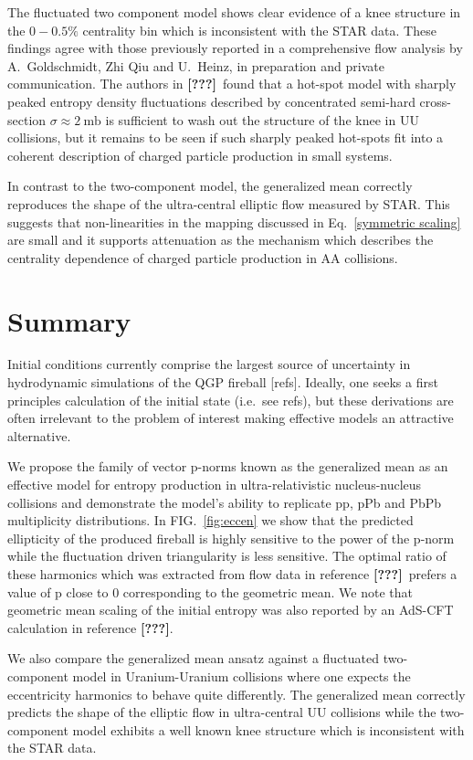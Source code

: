\documentclass[aps,prl,reprint,amsmath,nofootinbib]{revtex4-1}
\newcommand{\needcite}{\textbf{[???]}}
\begin{document}
The fluctuated two component model shows clear evidence of a knee structure in the $0-0.5\%$ centrality bin
which is inconsistent with the STAR data. These findings agree with those previously reported in a
comprehensive flow analysis by A.\ Goldschmidt, Zhi Qiu and U.\ Heinz, in preparation and private communication.
The authors in \needcite\ found that a hot-spot model with sharply peaked entropy density fluctuations described by
concentrated semi-hard cross-section $\sigma \approx 2 ~\mathrm{mb}$ is sufficient to wash out the structure
of the knee in UU collisions, but it remains to be seen if such sharply peaked hot-spots fit into a coherent
description of charged particle production in small systems.

In contrast to the two-component model, the generalized mean correctly reproduces the shape of the
ultra-central elliptic flow measured by STAR. This suggests that non-linearities in the mapping discussed in
Eq.~\eqref{symmetric scaling} are small and it supports attenuation as the mechanism which describes the
centrality dependence of charged particle production in AA collisions.


\section{Summary}

Initial conditions currently comprise the largest source of uncertainty in hydrodynamic simulations of the QGP
fireball [refs]. Ideally, one seeks a first principles calculation of the initial state (i.e.\ see refs), but
these derivations are often irrelevant to the problem of interest making effective models an attractive
alternative.

We propose the family of vector p-norms known as the generalized mean as an effective model for entropy
production in ultra-relativistic nucleus-nucleus collisions and demonstrate the model's ability to
replicate pp, pPb and PbPb multiplicity distributions. In FIG.~\ref{fig:eccen} we show that the predicted
ellipticity of the produced fireball is highly sensitive to the power of the p-norm while the fluctuation
driven triangularity is less sensitive. The optimal ratio of these harmonics which was extracted from flow
data in reference \needcite\ prefers a value of p close to 0 corresponding to the geometric mean. We note that
geometric mean scaling of the initial entropy was also reported by an AdS-CFT calculation in reference
\needcite.

We also compare the generalized mean ansatz against a fluctuated two-component model in Uranium-Uranium
collisions where one expects the eccentricity harmonics to behave quite differently. The generalized mean
correctly predicts the shape of the elliptic flow in ultra-central UU collisions while the two-component model
exhibits a well known knee structure which is inconsistent with the STAR data.



\end{document}
